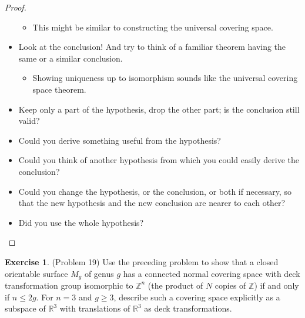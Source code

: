 \documentclass[12pt, psamsfonts]{amsart}
\theoremstyle{definition}
\newtheorem*{exer}{Exercise}
\theoremstyle{remark}
\numberwithin{equation}{section}
\begin{document}
\begin{proof}
\begin{itemize}
    \begin{itemize}
      \item
        This might be similar to constructing the universal covering space.
    \end{itemize}
  \item Look at the conclusion! And try to think of a familiar theorem having the same or a similar conclusion.
    \begin{itemize}
      \item
        Showing uniqueness up to isomorphism sounds like the universal covering space theorem.
    \end{itemize}
  \item Keep only a part of the hypothesis, drop the other part; is the conclusion still valid?
  \item Could you derive something useful from the hypothesis?
  \item Could you think of another hypothesis from which you could easily derive the conclusion?
  \item Could you change the hypothesis, or the conclusion, or both if necessary, so that the new hypothesis and the new conclusion are nearer to each other?
  \item Did you use the whole hypothesis?
\end{itemize}
\end{proof}

\begin{exer}{(Problem 19)}
  Use the preceding problem to show that a closed orientable surface $M_g$ of genus $g$ has a connected normal covering space with deck transformation group isomorphic to $\mathbb{Z}^n$ (the product of $N$ copies of $\mathbb{Z}$) if and only if $n \leq 2g$.
  For $n = 3$ and $g \geq 3$, describe such a covering space explicitly as a subspace of $\mathbb{R}^3$ with translations of $\mathbb{R}^3$ as deck transformations.
\end{exer}
\end{document}
